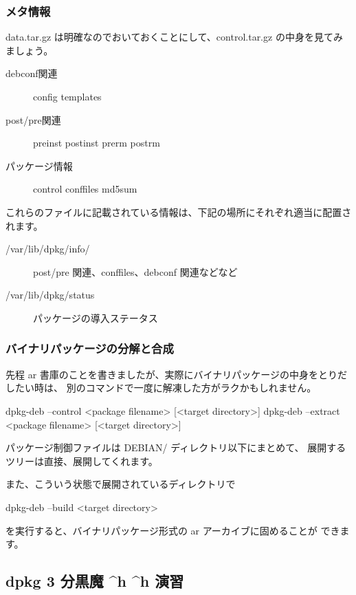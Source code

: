\documentclass[mingoth,a4paper]{jsarticle}
\begin{document}
\subsubsection{メタ情報}
data.tar.gz は明確なのでおいておくことにして、control.tar.gz の中身を見てみましょう。

\begin{description}
\item[debconf関連] config
templates
\item[post/pre関連] preinst
postinst
prerm
postrm
\item[パッケージ情報]
control
conffiles
md5sum
\end{description}

これらのファイルに記載されている情報は、下記の場所にそれぞれ適当に配置されます。
\begin{description}
\item[/var/lib/dpkg/info/] post/pre 関連、conffiles、debconf 関連などなど
\item[/var/lib/dpkg/status] パッケージの導入ステータス
\end{description}


\subsubsection{バイナリパッケージの分解と合成}

先程 ar 書庫のことを書きましたが、実際にバイナリパッケージの中身をとりだしたい時は、
別のコマンドで一度に解凍した方がラクかもしれません。

\begin{commandline}
dpkg-deb --control <package filename> [<target directory>]
dpkg-deb --extract <package filename> [<target directory>]
\end{commandline}

パッケージ制御ファイルは DEBIAN/ ディレクトリ以下にまとめて、
展開するツリーは直接、展開してくれます。

また、こういう状態で展開されているディレクトリで

\begin{commandline}
dpkg-deb --build <target directory>
\end{commandline}

を実行すると、バイナリパッケージ形式の ar アーカイブに固めることが
できます。

\subsection{dpkg 3 分黒魔 \textasciicircum h \textasciicircum h 演習}
\end{document}
